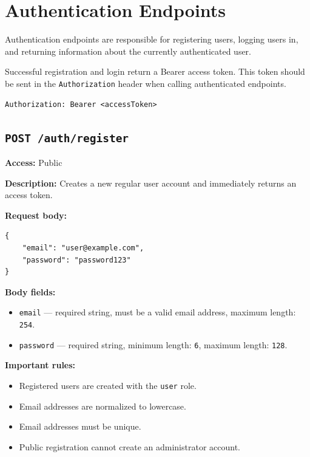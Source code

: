 \section{Authentication Endpoints}

Authentication endpoints are responsible for registering users, logging users in, and returning information about the currently authenticated user.

Successful registration and login return a Bearer access token. This token should be sent in the \texttt{Authorization} header when calling authenticated endpoints.

\begin{verbatim}
Authorization: Bearer <accessToken>
\end{verbatim}

\subsection{\texttt{POST /auth/register}}

\textbf{Access:} Public

\textbf{Description:} Creates a new regular user account and immediately returns an access token.

\textbf{Request body:}

\begin{verbatim}
{
	"email": "user@example.com",
	"password": "password123"
}
\end{verbatim}

\textbf{Body fields:}

\begin{itemize}
    \item \texttt{email} --- required string, must be a valid email address, maximum length: \texttt{254}.
    \item \texttt{password} --- required string, minimum length: \texttt{6}, maximum length: \texttt{128}.
\end{itemize}

\textbf{Important rules:}

\begin{itemize}
    \item Registered users are created with the \texttt{user} role.
    \item Email addresses are normalized to lowercase.
    \item Email addresses must be unique.
    \item Public registration cannot create an administrator account.
\end{itemize}

